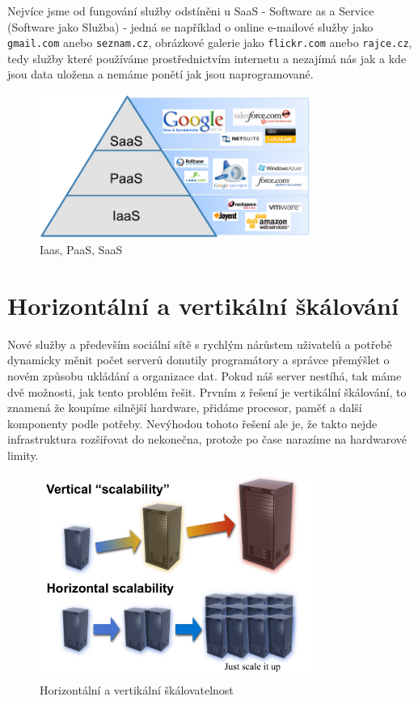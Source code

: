 Nejvíce jsme od fungování služby odstíněni u SaaS - Software as a Service (Software jako Služba) - jedná se například o online e-mailové služby jako \verb|gmail.com| anebo \verb|seznam.cz|, obrázkové galerie jako \verb|flickr.com| anebo \verb|rajce.cz|, tedy služby které používáme prostřednictvím internetu a nezajímá nás jak a kde jsou data uložena a nemáme ponětí jak jsou naprogramované.

\begin{figure}[h]
\begin{center}
\includegraphics[width=3.5in]{figures/iaas-paas-saas.png}
\caption{Iaas, PaaS, SaaS}
\label{fig:iaas-paas-saas}
\end{center}
\end{figure}

\section{Horizontální a vertikální škálování}
Nové služby a především sociální sítě s rychlým nárůstem uživatelů a potřebě dynamicky měnit počet serverů donutily programátory a správce přemýšlet o novém způsobu ukládání a organizace dat. Pokud náš server nestíhá, tak máme dvě možnosti, jak tento problém řešit. Prvním z řešení je vertikální škálování, to znamená že koupíme silnější hardware, přidáme procesor, paměť a další komponenty podle potřeby. Nevýhodou tohoto řešení ale je, že takto nejde infrastruktura rozšiřovat do nekonečna, protože po čase narazíme na hardwarové limity. 

\begin{figure}[h]
\begin{center}
\includegraphics[width=3.5in]{figures/horizontal-vertical-scalability.jpeg}
\caption{Horizontální a vertikální škálovatelnost}
\label{fig:horizontal-vertical-scalability}
\end{center}
\end{figure}

